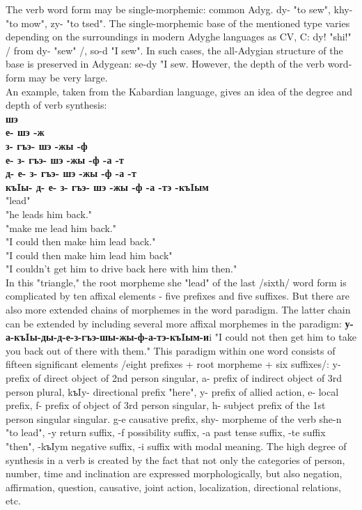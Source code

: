 \documentclass[a4paper,12pt]{book}
\newcommand{\1}[1]{\textbf{\emph{#1}}} %
\newcommand{\2}[1]{\textbf{[#1]}} %
\newcommand{\3}[1]{\fontsize{11pt}{0cm}\textbf{\emph{#1}}} %
\newcommand{\4}[1]{\fontsize{10pt}{0cm}\emph{#1}}	%
\newcommand{\5}[1]{\textbf{/#1/}} %
\newcommand{\6}[1]{\textbf{[#1]}} %
\newcommand{\7}[1]{\fontsize{12pt}{0cm}\emph{#1}} %
\newcommand{\8}[1]{\fontsize{12pt}{0cm}`#1'} %
\newcommand{\9}[1]{\fontsize{12pt}{0cm}(lit. `#1')} %
\begin{document}
The verb word form may be single-morphemic: common Adyg. dy- "to sew", khy- "to mow", zy- "to tsed". The single-morphemic base of the mentioned type varies depending on the surroundings in modern Adyghe languages as CV, C: dy! "shi!" / from dy- "sew" /, so-d "I sew". In such cases, the all-Adygian structure of the base is preserved in Adygean: se-dy "I sew. However, the depth of the verb word-form may be very large.\\
An example, taken from the Kabardian language, gives an idea of the degree and depth of verb synthesis:\\
\textbf{шэ}\\
\textbf{е- шэ -ж}\\
\textbf{з- гъэ- шэ -жы -ф}\\
\textbf{е- з- гъэ- шэ -жы -ф -а -т}\\
\textbf{д- е- з- гъэ- шэ -жы -ф -а -т}\\
\textbf{къIы- д- е- з- гъэ- шэ -жы -ф -а -тэ -къIым}\\
"lead"\\
"he leads him back."\\
"make me lead him back."\\
"I could then make him lead back."\\
"I could then make him lead him back"\\
"I couldn't get him to drive back here with him then."\\

In this "triangle," the root morpheme she "lead" of the last /sixth/ word form is complicated by ten affixal elements - five prefixes and five suffixes. But there are also more extended chains of morphemes in the word paradigm. The latter chain can be extended by including several more affixal morphemes in the paradigm: \textbf{у-а-къIы-ды-д-е-з-гъэ-шы-жы-ф-а-тэ-къIым-и}i "I could not then get him to take you back out of there with them." This paradigm within one word consists of fifteen significant elements /eight prefixes + root morpheme + six suffixes/: y- prefix of direct object of 2nd person singular, a- prefix of indirect object of 3rd person plural, kъIy- directional prefix "here", y- prefix of allied action, e- local prefix, f- prefix of object of 3rd person singular, h- subject prefix of the 1st person singular singular. g-e causative prefix, shy- morpheme of the verb she-n "to lead", -y return suffix, -f possibility suffix, -a past tense suffix, -te suffix "then", -kъIym negative suffix, -i suffix with modal meaning. The high degree of synthesis in a verb is created by the fact that not only the categories of person, number, time and inclination are expressed morphologically, but also negation, affirmation, question, causative, joint action, localization, directional relations, etc.
\end{document}
